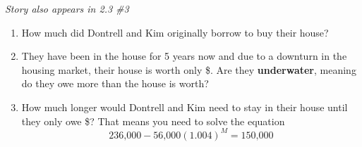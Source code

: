 \begin{enumerate}
 \hfill \emph{Story also appears in 2.3 \#3}
 \begin{enumerate}
\item How much did Dontrell and Kim originally borrow to buy their house?   \vfill
\item They have been in the house for 5 years now and due to a downturn in the housing market, their house is worth only \$.   Are they \textbf{underwater}, meaning do they owe more than the house is worth? \vfill
\item How much longer would Dontrell and Kim need to stay in their house until they only owe \$?  That means you need to solve the equation $$\text{236,000}-\text{56,000}(1.004)^M=\text{150,000}$$
 \vfill \vfill
\end{enumerate}

\end{enumerate}


